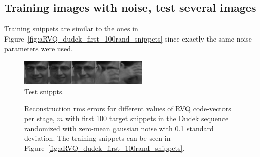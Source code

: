 \clearpage
\newpage
\subsection{Training images with noise, test several images}
Training snippets are similar to the ones in Figure~\ref{fig:aRVQ_dudek_first_100rand_snippets} since exactly the same noise parameters were used.


								\begin{figure}[h!]
								\centering
								\includegraphics[width=0.55\textwidth]{thesis2/aRVQ_dudek_first_100_to_105_snippets.pdf}
								\caption{Test snippts.}
								\label{fig:aRVQ_Dudek_first_100_rand}
								\end{figure}


								\begin{figure}[h]
								\centering
								\subtable{\begin{tiny}\end{tiny}}
								\caption{Reconstruction rms errors for different values of RVQ code-vectors per stage, $m$ with first 100 target snippets in the Dudek sequence randomized with zero-mean gaussian noise with 0.1 standard deviation.  The training snippets can be seen in Figure~\ref{fig:aRVQ_dudek_first_100rand_snippets}.}
								\label{fig:aRVQ_Dudek_first_100_rand}
								\end{figure}

\clearpage
\newpage
\normalsize


